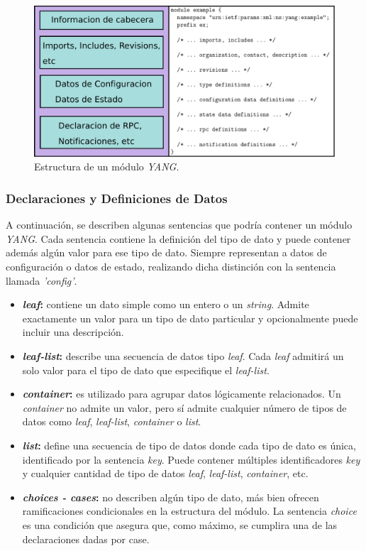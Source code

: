   \begin{figure}[htbp]
	\centering
	\includegraphics[scale=0.4]{Figures/estructura_modulo.pdf}
	\caption{Estructura de un módulo \textit{YANG}.}
	\label{fig:estructura_modulo}
  \end{figure}

  \subsubsection{Declaraciones y Definiciones de Datos}
  A continuación, se describen algunas sentencias que podría contener un módulo \textit{YANG}. Cada sentencia contiene la definición del tipo de dato y puede contener además algún valor para ese tipo de dato. Siempre representan a datos de configuración o datos de estado, realizando dicha distinción con la sentencia llamada \textit{'config'}.  

  \begin{itemize}
	\item \textbf{\textit{leaf}:} contiene un dato simple como un entero o un \textit{string}. Admite exactamente un valor para un tipo de dato particular y opcionalmente puede incluir una descripción. 
	\item \textbf{\textit{leaf-list}:} describe una secuencia de datos tipo \textit{leaf}. Cada \textit{leaf} admitirá un solo valor para el tipo de dato que especifique el \textit{leaf-list}.
	\item \textbf{\textit{container}:} es utilizado para agrupar datos lógicamente relacionados. Un \textit{container} no admite un valor, pero sí admite cualquier número de tipos de datos como \textit{leaf}, \textit{leaf-list}, \textit{container} o \textit{list}.
	\item \textbf{\textit{list}:} define una secuencia de tipo de datos donde cada tipo de dato es única, identificado por la sentencia \textit{key}. Puede contener múltiples identificadores \textit{key} y cualquier cantidad de tipo de datos \textit{leaf}, \textit{leaf-list}, \textit{container}, etc.
	\item \textbf{\textit{choices - cases}:} no describen algún tipo de dato, más bien ofrecen ramificaciones condicionales en la estructura del módulo. La sentencia \textit{choice} es una condición que asegura que, como máximo, se cumplira una de las declaraciones dadas por case.
\end{itemize}

